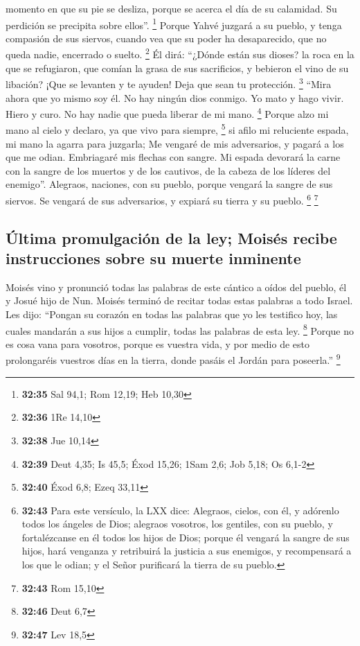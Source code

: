 \begin{paracol}{2}
momento en que su pie se desliza, porque se acerca el día de su
calamidad. Su perdición se precipita sobre ellos''. \footnote{\textbf{32:35}
  Sal 94,1; Rom 12,19; Heb 10,30}  Porque Yahvé juzgará a
su pueblo, y tenga compasión de sus siervos, cuando vea que su poder ha
desaparecido, que no queda nadie, encerrado o suelto. \footnote{\textbf{32:36}
  1Re 14,10}  Él dirá: ``¿Dónde están sus dioses? la roca
en la que se refugiaron,  que comían la grasa de sus
sacrificios, y bebieron el vino de su libación? ¡Que se levanten y te
ayuden! Deja que sean tu protección. \footnote{\textbf{32:38} Jue 10,14}
 ``Mira ahora que yo mismo soy él. No hay ningún dios
conmigo. Yo mato y hago vivir. Hiero y curo. No hay nadie que pueda
liberar de mi mano. \footnote{\textbf{32:39} Deut 4,35; Is 45,5; Éxod
  15,26; 1Sam 2,6; Job 5,18; Os 6,1-2}  Porque alzo mi
mano al cielo y declaro, ya que vivo para siempre, \footnote{\textbf{32:40}
  Éxod 6,8; Ezeq 33,11}  si afilo mi reluciente espada,
mi mano la agarra para juzgarla; Me vengaré de mis adversarios, y pagará
a los que me odian.  Embriagaré mis flechas con sangre.
Mi espada devorará la carne con la sangre de los muertos y de los
cautivos, de la cabeza de los líderes del enemigo''. 
Alegraos, naciones, con su pueblo, porque vengará la sangre de sus
siervos. Se vengará de sus adversarios, y expiará su tierra y su pueblo.
\footnote{\textbf{32:43} Para este versículo, la LXX dice: Alegraos,
  cielos, con él, y adórenlo todos los ángeles de Dios; alegraos
  vosotros, los gentiles, con su pueblo, y fortalézcanse en él todos los
  hijos de Dios; porque él vengará la sangre de sus hijos, hará venganza
  y retribuirá la justicia a sus enemigos, y recompensará a los que le
  odian; y el Señor purificará la tierra de su pueblo.} \footnote{\textbf{32:43}
  Rom 15,10}

\hypertarget{uxfaltima-promulgaciuxf3n-de-la-ley-moisuxe9s-recibe-instrucciones-sobre-su-muerte-inminente}{%
\subsection{Última promulgación de la ley; Moisés recibe instrucciones
sobre su muerte
inminente}\label{uxfaltima-promulgaciuxf3n-de-la-ley-moisuxe9s-recibe-instrucciones-sobre-su-muerte-inminente}}

 Moisés vino y pronunció todas las palabras de este
cántico a oídos del pueblo, él y Josué hijo de Nun. 
Moisés terminó de recitar todas estas palabras a todo Israel.
 Les dijo: ``Pongan su corazón en todas las palabras que
yo les testifico hoy, las cuales mandarán a sus hijos a cumplir, todas
las palabras de esta ley. \footnote{\textbf{32:46} Deut 6,7}
 Porque no es cosa vana para vosotros, porque es vuestra
vida, y por medio de esto prolongaréis vuestros días en la tierra, donde
pasáis el Jordán para poseerla.'' \footnote{\textbf{32:47} Lev 18,5}


\end{paracol}
